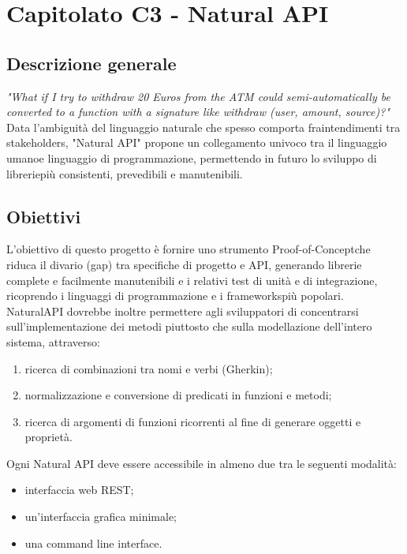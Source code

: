 \section{Capitolato C3 - Natural API}

\subsection{Descrizione generale}
\textit{"What if I try to withdraw 20 Euros from the ATM could semi-automatically be converted to a function with a signature like withdraw (user, amount, source)?"} \\
Data l’ambiguità del linguaggio naturale che spesso comporta fraintendimenti tra stakeholders\glo, "Natural API" propone un collegamento univoco tra il linguaggio umano\glo e linguaggio di programmazione\glo, permettendo in futuro lo sviluppo di librerie\glo più consistenti, prevedibili e manutenibili\glo.


\subsection{Obiettivi}
L’obiettivo di questo progetto è fornire uno strumento Proof-of-Concept\glo che riduca il divario (gap) tra specifiche di progetto e API\glo, generando librerie complete e facilmente manutenibili e i relativi test di unità e di integrazione, ricoprendo i linguaggi di programmazione e i frameworks\glo più popolari.
NaturalAPI dovrebbe inoltre permettere agli sviluppatori di concentrarsi sull’implementazione dei metodi piuttosto che sulla modellazione dell’intero sistema, attraverso: \begin{enumerate}
\item ricerca di combinazioni tra nomi e verbi (Gherkin);
\item normalizzazione e conversione di predicati in funzioni e metodi;
\item ricerca di argomenti di funzioni ricorrenti al fine di generare oggetti e proprietà.
\end{enumerate}
Ogni Natural API deve essere accessibile in almeno due tra le seguenti modalità: \begin{itemize}
\item interfaccia web REST\glo;
\item un’interfaccia grafica minimale;
\item una command line interface\glo.
\end{itemize}

